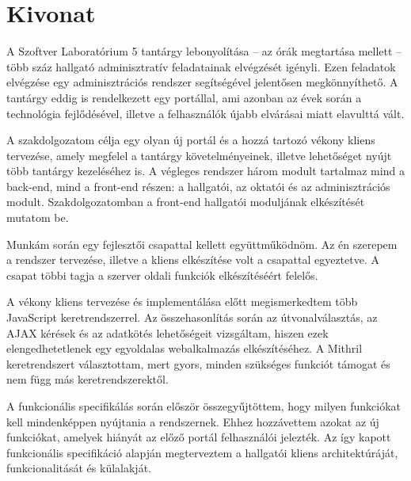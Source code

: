 \setcounter{page}{1}

\hungarianParagraph


\chapter*{Kivonat}

A Szoftver Laboratórium 5 tantárgy lebonyolítása -- az órák megtartása mellett -- több száz hallgató adminisztratív feladatainak elvégzését igényli. Ezen feladatok elvégzése egy adminisztrációs rendszer segítségével jelentősen megkönnyíthető. A tantárgy eddig is rendelkezett egy portállal, ami azonban az évek során a technológia fejlődésével, illetve a felhasználók újabb elvárásai miatt elavulttá vált.

A szakdolgozatom célja egy olyan új portál és a hozzá tartozó vékony kliens tervezése, amely megfelel a tantárgy követelményeinek, illetve lehetőséget nyújt több tantárgy kezeléséhez is. A végleges rendszer három modult tartalmaz mind a back-end, mind a front-end részen: a hallgatói, az oktatói és az adminisztrációs modult. Szakdolgozatomban a front-end hallgatói moduljának elkészítését mutatom be. 

Munkám során egy fejlesztői csapattal kellett együttműködnöm. Az én szerepem a rendszer tervezése, illetve a kliens elkészítése volt a csapattal egyeztetve. A csapat többi tagja a szerver oldali funkciók elkészítéséért felelős.

A vékony kliens tervezése és implementálása előtt megismerkedtem több JavaScript keretrendszerrel. Az összehasonlítás során az útvonalválasztás, az AJAX kérések és az adatkötés lehetőségeit vizsgáltam, hiszen ezek elengedhetetlenek egy egyoldalas webalkalmazás elkészítéséhez. A Mithril keretrendszert választottam, mert gyors, minden szükséges funkciót támogat és nem függ más keretrendszerektől. 

A funkcionális specifikálás során először összegyűjtöttem, hogy milyen funkciókat kell mindenképpen nyújtania a rendszernek. Ehhez hozzávettem azokat az új funkciókat, amelyek hiányát az előző portál felhasználói jelezték. Az így kapott funkcionális specifikáció alapján megterveztem a hallgatói kliens architektúráját, funkcionalitását és külalakját.

